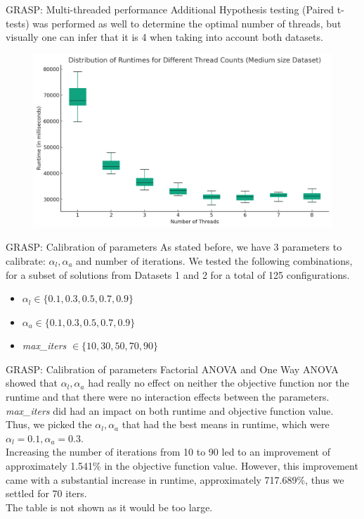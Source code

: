 \documentclass{beamer}
\begin{document}
\begin{frame}{GRASP: Multi-threaded performance}
Additional Hypothesis testing (Paired t-tests) was performed as well to determine the optimal number of threads, but visually one can infer that it is 4 when taking into account both datasets. 
        \begin{figure}
        \centering
        \includegraphics[scale=0.4]{boxplot_medium.png}
    \end{figure}
\end{frame}

\begin{frame}{GRASP: Calibration of parameters}
As stated before, we have 3 parameters to calibrate: $\alpha_l, \alpha_a$ and number of iterations. We tested the following combinations, for a subset of solutions from Datasets 1 and 2 for a total of 125 configurations.
    \begin{itemize}
        \item $\alpha_l \in \{0.1, 0.3, 0.5, 0.7, 0.9\}$
        \item $\alpha_a \in \{0.1, 0.3, 0.5, 0.7, 0.9\}$
        \item \textit{max\_iters} $\in \{10, 30, 50, 70, 90\}$
    \end{itemize}
\end{frame}

\begin{frame}{GRASP: Calibration of parameters}
Factorial ANOVA and One Way ANOVA showed that $\alpha_l, \alpha_a$ had really no effect on neither the objective function nor the runtime and that there were no interaction effects between the parameters. \textit{max\_iters} did had an impact on both runtime and objective function value. Thus, we picked the $\alpha_l, \alpha_a$ that had the best means in runtime, which were $\alpha_l = 0.1, \alpha_a = 0.3$.
\\Increasing the number of iterations from 10 to 90 led to an improvement of approximately 1.541\% in the objective function value. However, this improvement came with a substantial increase in runtime, approximately 717.689\%, thus we settled for 70 iters.
\\
\medskip
\scriptsize The table is not shown as it would be too large.
\end{frame}
\end{document}
